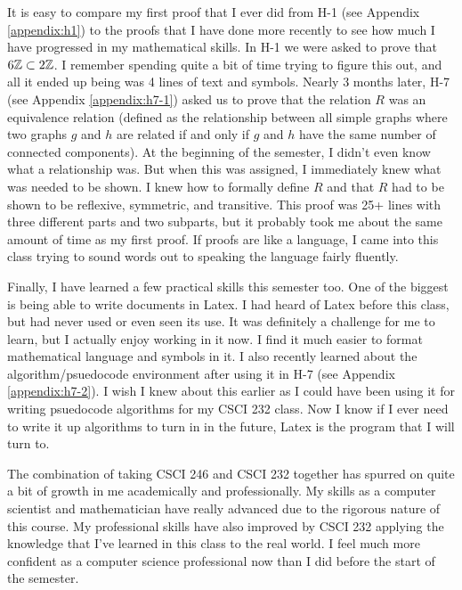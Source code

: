 \documentclass{article}
\begin{document}
\begin{doublespace}
\qquad It is easy to compare my first proof that I ever did from H-1 (see Appendix \ref{appendix:h1}) to the proofs that I have done more recently to see how much I have progressed in my mathematical skills. In H-1 we were asked to prove that $6{\mathbb Z} \subset 2{\mathbb Z}$. I remember spending quite a bit of time trying to figure this out, and all it ended up being was 4 lines of text and symbols. Nearly 3 months later, H-7 (see Appendix \ref{appendix:h7-1}) asked us to prove that the relation $R$ was an equivalence relation (defined as the relationship between all simple graphs where two graphs $g$ and $h$ are related if and only if $g$ and $h$ have the same number of connected components). At the beginning of the semester, I didn't even know what a relationship was. But when this was assigned, I immediately knew what was needed to be shown. I knew how to formally define $R$ and that $R$ had to be shown to be reflexive, symmetric, and transitive. This proof was 25+ lines with three different parts and two subparts, but it probably took me about the same amount of time as my first proof. If proofs are like a language, I came into this class trying to sound words out to speaking the language fairly fluently.

\qquad Finally, I have learned a few practical skills this semester too. One of the biggest is being able to write documents in Latex. I had heard of Latex before this class, but had never used or even seen its use. It was definitely a challenge for me to learn, but I 
actually enjoy working in it now. I find it much easier to format mathematical language and symbols in it. I also recently learned about the algorithm/psuedocode environment after using it in H-7 (see Appendix \ref{appendix:h7-2}). I wish I knew about this earlier as I could have been using it for writing psuedocode algorithms for my CSCI 232 class. Now I know if I ever need to write it up algorithms to turn in in the future, Latex is the program that I will turn to.

\qquad The combination of taking CSCI 246 and CSCI 232 together has spurred on quite a bit of growth in me academically and professionally. My skills as a computer scientist and mathematician have really advanced due to the rigorous nature of this course. My professional skills have also improved by CSCI 232 applying the knowledge that I've learned in this class to the real world. I feel much more confident as a computer science professional now than I did before the start of the semester.
\end{doublespace}
\appendix
\appendixpage
\end{document}
